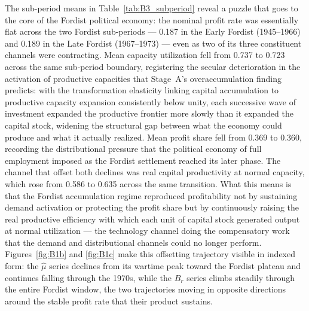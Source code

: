 The sub-period means in Table~\ref{tab:B3_subperiod} reveal a puzzle
that goes to the core of the Fordist political economy: the nominal
profit rate was essentially flat across the two Fordist sub-periods ---
0.187 in the Early Fordist (1945--1966) and 0.189 in the Late Fordist
(1967--1973) --- even as two of its three constituent channels were
contracting. Mean capacity utilization fell from 0.737 to 0.723 across
the same sub-period boundary, registering the secular deterioration in
the activation of productive capacities that Stage~A's overaccumulation
finding predicts: with the transformation elasticity linking capital
accumulation to productive capacity expansion consistently below unity,
each successive wave of investment expanded the productive frontier more
slowly than it expanded the capital stock, widening the structural gap
between what the economy could produce and what it actually realized.
Mean profit share fell from 0.369 to 0.360, recording the distributional
pressure that the political economy of full employment imposed as the
Fordist settlement reached its later phase. The channel that offset both
declines was real capital productivity at normal capacity, which rose
from 0.586 to 0.635 across the same transition. What this means is that
the Fordist accumulation regime reproduced profitability not by sustaining
demand activation or protecting the profit share but by continuously
raising the real productive efficiency with which each unit of capital
stock generated output at normal utilization --- the technology channel
doing the compensatory work that the demand and distributional channels
could no longer perform. Figures~\ref{fig:B1b} and \ref{fig:B1c} make
this offsetting trajectory visible in indexed form: the $\hat{\mu}$
series declines from its wartime peak toward the Fordist plateau and
continues falling through the 1970s, while the $B_{r}$ series climbs
steadily through the entire Fordist window, the two trajectories moving
in opposite directions around the stable profit rate that their product
sustains.


